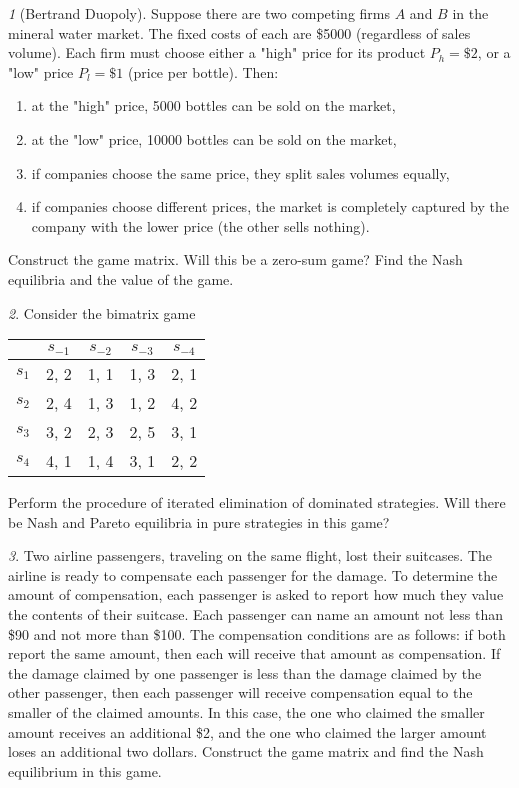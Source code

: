 \documentclass[12pt]{article}
\theoremstyle{remark}
\newtheorem{exercise}{}[subsection]
\begin{document}
\begin{exercise}[Bertrand Duopoly]
Suppose there are two competing firms $A$ and $B$ in the mineral water market.
The fixed costs of each are \$5000
(regardless of sales volume). Each firm
must choose either a "high" price for its product $P_h=\$2$, or a "low" price $P_l=\$1$
(price per bottle). Then:
\begin{enumerate}
	\item at the "high" price, 5000 bottles can be sold on the market,
	\item at the "low" price, 10000 bottles can be sold on the market,
	\item if companies choose the same price, they split sales volumes equally,
	\item if companies choose different prices, the market is completely captured by the company
	with the lower price (the other sells nothing).
\end{enumerate}
Construct the game matrix. Will this be a zero-sum game? Find the Nash equilibria
and the value of the game.
\end{exercise}

\begin{exercise}
Consider the bimatrix game
\begin{center}
	\begin{tabular}{|c||c|c|c|c|}
	 \hline
	& $s_{-1}$ & $s_{-2}$ & $s_{-3}$ & $s_{-4}$\\ \hline \hline
	$s_1$ & 2, 2 & 1, 1 & 1, 3 & 2, 1\\ \hline
	$s_2$ & 2, 4 & 1, 3 & 1, 2 & 4, 2\\ \hline
	$s_3$ & 3, 2 & 2, 3 & 2, 5 & 3, 1 \\ \hline
	$s_4$ & 4, 1 & 1, 4 & 3, 1 & 2, 2 \\
	\hline
	\end{tabular}
\end{center}
Perform the procedure of iterated elimination of dominated strategies.
Will there be Nash and Pareto equilibria in pure strategies in this game?
\end{exercise}

\begin{exercise}
Two airline passengers, traveling on the same flight, lost their suitcases.
The airline is ready to compensate each passenger for the damage.
To determine the amount of compensation, each passenger is asked to report
how much they value the contents of their suitcase.
Each passenger can name an amount not less than \$90 and not more than \$100.
The compensation conditions are as follows: if both report the same amount,
then each will receive that amount as compensation.
If the damage claimed by one passenger is less
than the damage claimed by the other passenger, then each passenger will receive compensation
equal to the smaller of the claimed amounts. In this case, the one who claimed the smaller amount
receives an additional \$2, and the one who claimed the larger amount loses an additional two dollars.
Construct the game matrix and find the Nash equilibrium in this game.
\end{exercise}
\end{document}
